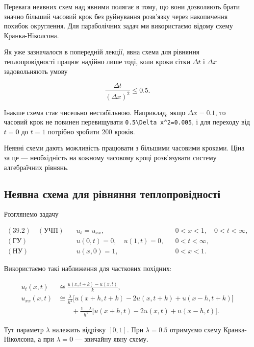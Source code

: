 \documentclass[
  ukrainian,
]{article}
\begin{document}
Перевага неявних схем над явними полягає в тому, що вони дозволяють
брати значно більший часовий крок без руйнування розв'язку через
накопичення похибок округлення. Для параболічних задач ми використаємо
відому схему Кранка-Ніколсона.

Як уже зазначалося в попередній лекції, явна схема для рівняння
теплопровідності працює надійно лише тоді, коли кроки сітки \(\Delta t\)
і \(\Delta x\) задовольняють умову

\[
\frac{\Delta t}{(\Delta x)^2}\le 0.5.
\]

Інакше схема стає чисельно нестабільною. Наприклад, якщо
\(\Delta x=0.1\), то часовий крок не повинен перевищувати
\texttt{0.5\textbackslash{}Delta\ x\^{}2=0.005}, і для переходу від
\(t=0\) до \(t=1\) потрібно зробити 200 кроків.

Неявні схеми дають можливість працювати з більшими часовими кроками.
Ціна за це --- необхідність на кожному часовому кроці розв'язувати
систему алгебраїчних рівнянь.

\subsection{Неявна схема для рівняння
теплопровідності}\label{ux43dux435ux44fux432ux43dux430-ux441ux445ux435ux43cux430-ux434ux43bux44f-ux440ux456ux432ux43dux44fux43dux43dux44f-ux442ux435ux43fux43bux43eux43fux440ux43eux432ux456ux434ux43dux43eux441ux442ux456}

Розглянемо задачу

\[
\begin{aligned}(39.2)\quad (\text{УЧП})\quad & u_t=u_{xx}, && 0<x<1,\quad 0<t<\infty,\\(\text{ГУ})\quad & u(0,t)=0,\quad u(1,t)=0, && 0<t<\infty,\\(\text{НУ})\quad & u(x,0)=1, && 0<x<1.\end{aligned}
\]

Використаємо такі наближення для часткових похідних:

\[
\begin{aligned}u_t(x,t) &\cong \frac{u(x,t+k)-u(x,t)}{k},\\u_{xx}(x,t) &\cong\frac{\lambda}{h^2}\bigl[u(x+h,t+k)-2u(x,t+k)+u(x-h,t+k)\bigr]\\&\qquad +\frac{1-\lambda}{h^2}\bigl[u(x+h,t)-2u(x,t)+u(x-h,t)\bigr].\end{aligned}
\]

Тут параметр \(\lambda\) належить відрізку \([0,1]\). При
\(\lambda=0.5\) отримуємо схему Кранка-Ніколсона, а при \(\lambda=0\)
--- звичайну явну схему.
\end{document}
